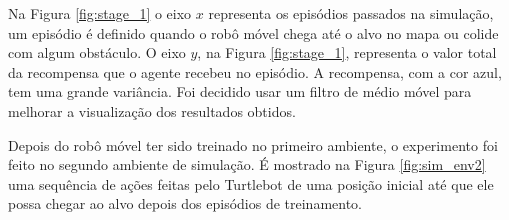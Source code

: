 Na Figura \ref{fig:stage_1} o eixo $x$ representa os episódios passados na simulação, um episódio é definido quando o robô móvel chega até o alvo no mapa ou colide com algum obstáculo.
O eixo $y$, na Figura \ref{fig:stage_1}, representa o valor total da recompensa que o agente recebeu no episódio.
A recompensa, com a cor azul, tem uma grande variância. Foi decidido usar um filtro de médio móvel para melhorar a visualização dos resultados obtidos.

Depois do robô móvel ter sido treinado no primeiro ambiente, o experimento foi feito no segundo ambiente de simulação.
É mostrado na Figura \ref{fig:sim_env2} uma sequência de ações feitas pelo Turtlebot de uma posição inicial até que ele possa chegar ao alvo depois dos episódios de treinamento.

\vspace{0.25cm}
